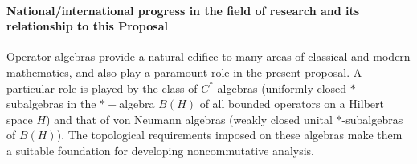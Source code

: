 \documentclass[12pt]{article}
\begin{document}
%
%
%


\paragraph*{National/international progress in the field of research and its relationship to this Proposal}

Operator algebras provide a natural edifice to many areas of classical and modern mathematics, and also play a paramount role in the present proposal. 
A particular role is played by the class of $C^{\ast}$-algebras (uniformly closed $\ast$-subalgebras in the $\ast-$algebra $B(H)$ of all bounded operators on a Hilbert space $H$) and that of von Neumann algebras (weakly closed unital $\ast$-subalgebras of $B(H)$). The topological requirements imposed on these algebras make them a suitable foundation for developing noncommutative analysis. 
\end{document}
